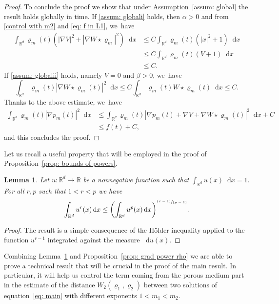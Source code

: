 \documentclass[JEP,XML,SOM,Unicode,published]{cedram}
\newcommand{\pspfrac}[2]{\sfrac{(#1)}{(#2)}}
\newcommand{\bbprt}[1]{\biggl(#1\biggr)}
\newcommand{\dx}[1]{\mathop{}\!\mathrm{d} #1}
\newcommand{\R}{\mathbb{R}}
\theoremstyle{plain}
\newtheorem{lemma}[theorem]{Lemma}
\theoremstyle{remark}
\begin{document}
\begin{proof}
To conclude the proof we show that under Assumption~\ref{assum: global} the result holds globally in time.
If \eqref{assum: globali} holds, then $\alpha >0$ and from \eqref{control with m2} and \eqref{eq: f in L1}, we~have
\begin{align*}
\int_{\R^d} \varrho_m(t) (|\nabla V|^2 + |\nabla W\star \varrho_m|^2) \dx x&\leq C \int_{\R^d} \varrho_m(t) (|x|^2+1)\dx x \\&\leq C \int_{\R^d} \varrho_m(t) (V+1)\dx x\\&\leq C.
\end{align*}
If \eqref{assum: globalii} holds, namely $V=0$ and $\beta > 0$, we~have
\begin{equation*}
\int_{\R^d} \varrho_m(t) |\nabla W\star \varrho_m(t)|^2 \dx x \leq C \int_{\R^d} \varrho_m(t) W\star \varrho_m(t)\dx x\leq C.
\end{equation*}
Thanks to the above estimate, we~have
\begin{align*}
\int_{\R^d} \varrho_m(t) |\nabla p_m(t)|^2 \dx x&\leq \int_{\R^d} \varrho_m(t) |\nabla p_m(t)+\nabla V +\nabla W\star \varrho_m(t)|^2 \dx x + C\\
&\leq f(t) + C,
\end{align*}
and this concludes the proof.
\end{proof}

Let us recall a useful property that will be employed in the proof of Proposition~\ref{prop: bounds of powers}.
\begin{lemma}\label{lemma}
Let $u:\R^d\to \R$ be a nonnegative function such that $\int_{\R^d} u(x)\dx x=1.$ For all $r,p$ such that $1<r<p$ we have
\begin{equation*}
\int_{\R^d} u^r(x) \dx x \leq \bbprt{\int_{\R^d}u^p(x) \dx x}^{\pspfrac{r-1}{p-1}}.
\end{equation*}
\end{lemma}
\begin{proof}
The result is a simple consequence of the Hölder inequality applied to the function $u^{r-1}$ integrated against the measure $\dx u(x)$.
\end{proof}

Combining Lemma~\ref{lemma} and Proposition~\ref{prop: grad power rho} we are able to prove a technical result that will be crucial in the proof of the main result. In particular, it will help us control the term coming from the porous medium part in the estimate of the distance $W_2(\varrho_1,\varrho_2)$ between two solutions of equation~\eqref{eq: main} with different exponents \hbox{$1<m_1< m_2$}.
\end{document}
